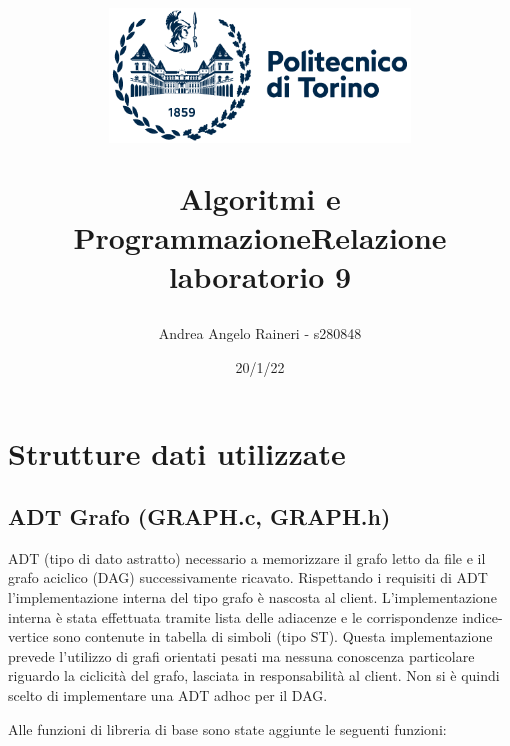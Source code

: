 \documentclass[11pt, a4paper, titlepage]{article}
\begin{document}
    \title{
        \begin{figure}[t]
            \includegraphics[width=8cm]{logo.png}
            \centering
        \end{figure}
            \textbf{Algoritmi e Programmazione\break Relazione laboratorio 9}
        }
    \author{Andrea Angelo Raineri - s280848}
    \date{20/1/22}
    \maketitle

    \section{Strutture dati utilizzate}

        \subsection{ADT Grafo (GRAPH.c, GRAPH.h)}
            ADT (tipo di dato astratto) necessario a memorizzare il grafo letto da file e il grafo aciclico (DAG) successivamente ricavato.
            Rispettando i requisiti di ADT l'implementazione interna del tipo grafo è nascosta al client.
            L'implementazione interna è stata effettuata tramite lista delle adiacenze e le corrispondenze indice-vertice sono contenute in tabella di simboli (tipo ST).
            Questa implementazione prevede l'utilizzo di grafi orientati pesati ma nessuna conoscenza particolare riguardo la ciclicità del grafo, lasciata in responsabilità al client. Non
            si è quindi scelto di implementare una ADT adhoc per il DAG.
            
            Alle funzioni di libreria di base sono state aggiunte le seguenti funzioni: 
\end{document}
